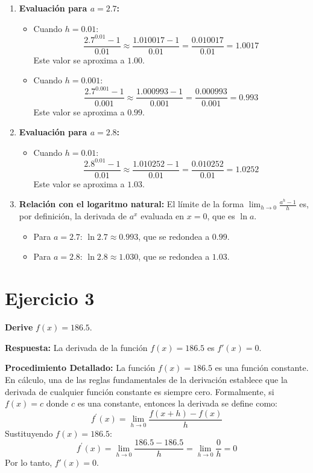 \documentclass[12pt, a4paper]{article}
\begin{document}
\begin{enumerate}
    \item \textbf{Evaluación para $a=2.7$:}
    \begin{itemize}
        \item Cuando $h=0.01$:
        \[\frac{2.7^{0.01}-1}{0.01} \approx \frac{1.010017-1}{0.01}=\frac{0.010017}{0.01}=1.0017\]
        Este valor se aproxima a $1.00$.
        \item Cuando $h=0.001$:
        \[\frac{2.7^{0.001} - 1}{0.001} \approx \frac{1.000993 - 1}{0.001}=\frac{0.000993}{0.001}=0.993\]
        Este valor se aproxima a $0.99$.
    \end{itemize}
    \item \textbf{Evaluación para $a=2.8$:}
    \begin{itemize}
        \item Cuando $h=0.01$:
        \[\frac{2.8^{0.01}-1}{0.01} \approx \frac{1.010252-1}{0.01}=\frac{0.010252}{0.01}=1.0252\]
        Este valor se aproxima a $1.03$.
    \end{itemize}
    \item \textbf{Relación con el logaritmo natural:} El límite de la forma $\lim_{h\to 0}\frac{a^h-1}{h}$ es, por definición, la derivada de $a^x$ evaluada en $x=0$, que es $\ln a$.
    \begin{itemize}
        \item Para $a=2.7$: $\ln 2.7 \approx 0.993$, que se redondea a $0.99$.
        \item Para $a=2.8$: $\ln 2.8 \approx 1.030$, que se redondea a $1.03$.
    \end{itemize}
\end{enumerate}

\section{Ejercicio 3}
\textbf{Derive} $f(x)=186.5$.

\textbf{Respuesta:}
La derivada de la función $f(x)=186.5$ es $f'(x)=0$.

\textbf{Procedimiento Detallado:}
La función $f(x)=186.5$ es una función constante. En cálculo, una de las reglas fundamentales de la derivación establece que la derivada de cualquier función constante es siempre cero. Formalmente, si $f(x)=c$ donde $c$ es una constante, entonces la derivada se define como:
\[f^{\prime}(x)=\lim_{h\to 0}\frac{f(x+h)-f(x)}{h}\]
Sustituyendo $f(x)=186.5$:
\[f^{\prime}(x)=\lim_{h\to 0}\frac{186.5-186.5}{h}=\lim_{h\to 0}\frac{0}{h}=0\]
Por lo tanto, $f'(x)=0$.
\end{document}
